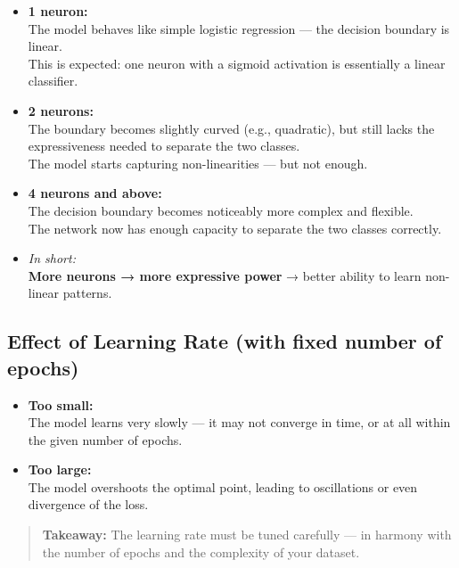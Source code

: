 \documentclass[11pt]{article}
\begin{document}
\begin{itemize}
    \item \textbf{1 neuron:} \\
    The model behaves like simple logistic regression — the decision boundary is linear.\\
    This is expected: one neuron with a sigmoid activation is essentially a linear classifier.

    \item \textbf{2 neurons:} \\
    The boundary becomes slightly curved (e.g., quadratic), but still lacks the expressiveness needed to separate the two classes.\\
    The model starts capturing non-linearities — but not enough.

    \item \textbf{4 neurons and above:} \\
    The decision boundary becomes noticeably more complex and flexible.\\
    The network now has enough capacity to separate the two classes correctly.

    \item \textit{In short:} \\
    \textbf{More neurons → more expressive power} → better ability to learn non-linear patterns.
\end{itemize}

\subsection*{Effect of Learning Rate (with fixed number of epochs)}

\begin{itemize}
    \item \textbf{Too small:} \\
    The model learns very slowly — it may not converge in time, or at all within the given number of epochs.

    \item \textbf{Too large:} \\
    The model overshoots the optimal point, leading to oscillations or even divergence of the loss.
\end{itemize}

\begin{quote}
\textbf{Takeaway:}  
The learning rate must be tuned carefully — in harmony with the number of epochs and the complexity of your dataset.
\end{quote}
\end{document}
